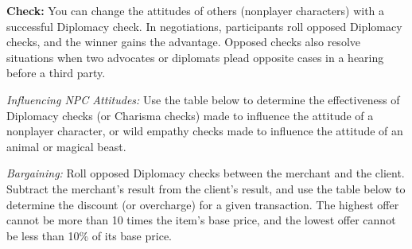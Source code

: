 \textbf{Check:} You can change the attitudes of others (nonplayer characters) with a successful Diplomacy check. In negotiations, participants roll opposed Diplomacy checks, and the winner gains the advantage. Opposed checks also resolve situations when two advocates or diplomats plead opposite cases in a hearing before a third party.

\textit{Influencing NPC Attitudes:} Use the table below to determine the effectiveness of Diplomacy checks (or Charisma checks) made to influence the attitude of a nonplayer character, or wild empathy checks made to influence the attitude of an animal or magical beast.



\textit{Bargaining:} Roll opposed Diplomacy checks between the merchant and the client. Subtract the merchant's result from the client's result, and use the table below to determine the discount (or overcharge) for a given transaction. The highest offer cannot be more than 10 times the item's base price, and the lowest offer cannot be less than 10\% of its base price.

